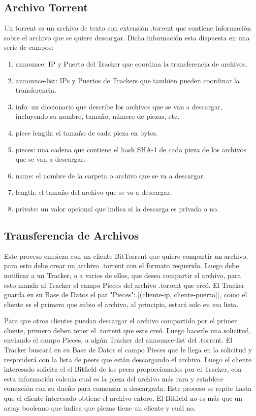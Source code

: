 \documentclass[article]{llncs}
\begin{document}
\subsection{Archivo Torrent}
Un torrent es un archivo de texto con extensi\'on .torrent que contiene informaci\'on sobre el archivo 
que se quiere descargar. Dicha informaci\'on esta dispuesta en una serie de campos:

\begin{enumerate}
  \item announce: IP y Puerto del Tracker que coordina la transferencia de archivos.
  \item announce-list: IPs y Puertos de Trackers que tambien pueden coordinar la transferencia.
  \item info: un diccionario que describe los archivos que se van a descargar, incluyendo su nombre, tamaño, número de piezas, etc.
  \item piece length: el tamaño de cada pieza en bytes.
  \item pieces: una cadena que contiene el hash SHA-1 de cada pieza de los archivos que se van a descargar.
  \item name: el nombre de la carpeta o archivo que se va a descargar.
  \item length: el tamaño del archivo que se va a descargar.
  \item private: un valor opcional que indica si la descarga es privada o no.
\end{enumerate}

\subsection{Transferencia de Archivos}
Este proceso empieza con un cliente BitTorrent que quiere compartir un archivo, para esto debe crear un archivo .torrent 
con el formato requerido. Luego debe notificar a un Tracker, o a varios de ellos, que desea compartir el archivo, para esto 
manda al Tracker el campo Pieces del archivo .torrent que creó. El Tracker guarda en su Base de Datos el par "Pieces": 
[(cliente-ip, cliente-puerto)], como el cliente es el primero que subio el archivo, al principio, estará solo en esa lista. 

Para que otros clientes puedan descargar el archivo compartido por el primer cliente, primero deben tener el .torrent que
este creó. Luego hacerle una solicitud, enviando el campo Pieces, a algún Tracker del announce-list del .torrent. El 
Tracker buscará en su Base de Datos el campo Pieces que le llega en la solicitud y  responderá con la lista de peers que 
están descargando el archivo. Luego el cliente interesado solicita el el Bitfield de los peers proporcionados por el Tracker, 
con esta información calcula cual es la pieza del archivo más rara y establece conexción con su dueño para comenzar a descargarla. 
Este proceso se repite hasta que el cliente interesado obtiene el archivo entero. El Bitfield no es más que un array 
booleano que indica que piezas tiene un cliente y cuál no.
\end{document}
